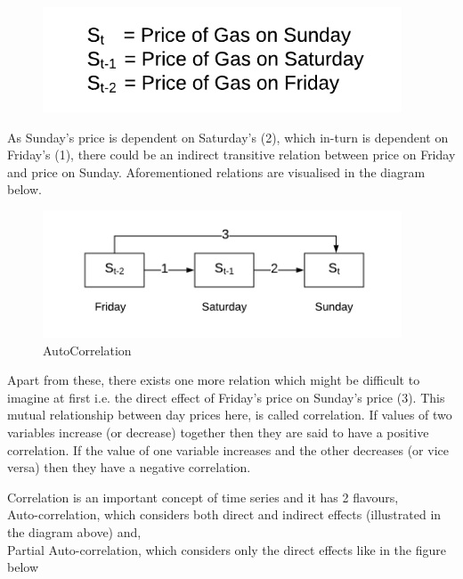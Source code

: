 \documentclass[12pt]{report}
\begin{document}
\begin{figure}[H]%
  \begin {center}
  \includegraphics[width=0.95\textwidth]{images/prices.png}
  
  \label{fig:ecg}
  \end {center}
\end{figure}

As Sunday’s price is dependent on Saturday’s (2), which in-turn is dependent on Friday’s (1), there could be an indirect transitive relation between price on Friday and price on Sunday.
Aforementioned relations are visualised in the diagram below.

\begin{figure}[H]%
  \begin {center}
  \includegraphics[width=0.95\textwidth]{images/prices_chart.png}
  \caption{AutoCorrelation}
  \label{fig:ecg}
  \end {center}
\end{figure}

Apart from these, there exists one more relation which might be difficult to imagine at first i.e. the direct effect of Friday’s price on Sunday’s price (3).
This mutual relationship between day prices here, is called correlation. If values of two variables increase (or decrease) together then they are said to have a positive correlation. If the value of one variable increases and the other decreases (or vice versa) then they have a negative correlation.

Correlation is an important concept of time series and it has 2 flavours,\\
Auto-correlation, which considers both direct and indirect effects (illustrated in the diagram above) and,\\
Partial Auto-correlation, which considers only the direct effects like in the figure below
\end{document}
